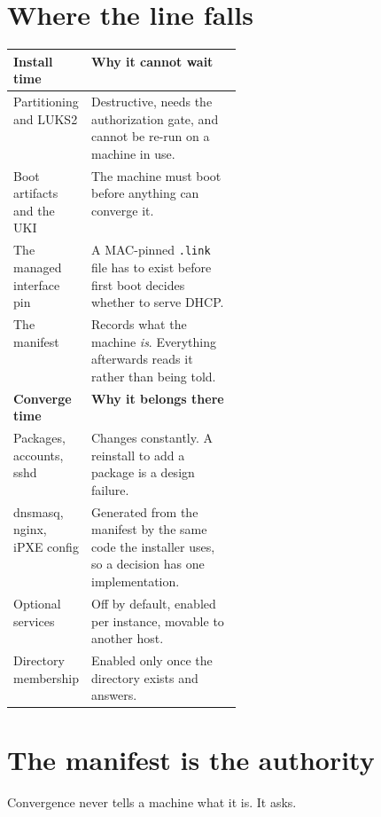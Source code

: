 \section{Where the line falls}
\begin{tabularx}{\linewidth}{@{}p{0.30\linewidth}L@{}}
\toprule
\textbf{Install time} & \textbf{Why it cannot wait}\\
\midrule
Partitioning and LUKS2 & Destructive, needs the authorization gate, and cannot be re-run on a machine in use. \\
Boot artifacts and the UKI & The machine must boot before anything can converge it.\\
The managed interface pin & A MAC-pinned \texttt{.link} file has to exist before first boot decides whether to serve DHCP. \\
The manifest & Records what the machine \emph{is}. Everything afterwards reads it rather than being told. \\
\midrule
\textbf{Converge time} & \textbf{Why it belongs there}\\
\midrule
Packages, accounts, sshd & Changes constantly. A reinstall to add a package is a design failure.\\
dnsmasq, nginx, iPXE config & Generated from the manifest by the same code the installer uses, so a decision has one implementation.\\
Optional services & Off by default, enabled per instance, movable to another host. \\
Directory membership & Enabled only once the directory exists and answers. \\
\bottomrule
\end{tabularx}

\section{The manifest is the authority}
Convergence never tells a machine what it is. It asks.

